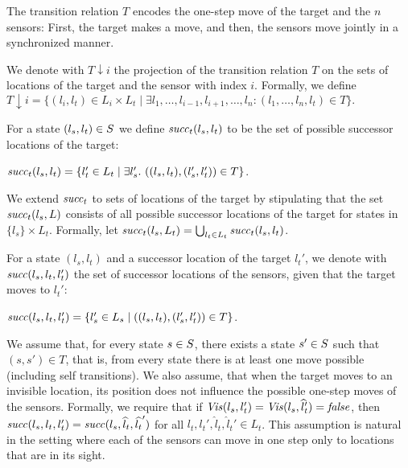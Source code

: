 The transition relation $T$ encodes the one-step move of the target and the $n$ sensors: First, the target makes a move, and then, the sensors move jointly in a synchronized manner. 

We denote with $T{\downarrow}i$ the projection of the transition relation $T$ on the sets of locations of the target and the sensor with index $i$. Formally, we define
$T{\downarrow }i = \{(l_i,l_t) \in L_i \times L_t \mid \exists l_1,\ldots,l_{i-1},l_{i+1},\ldots,l_n : (l_1,\ldots,l_n,l_t) \in T\}.$ 

For a state $(l_s,l_t) \in S$ we define $\mathit{succ}_t(l_s,l_t)$ to be the set of possible successor locations of the target:

$\mathit{succ}_t(l_s,l_{t}) = \{l_{t}' \in L_t \mid \exists l_s'.\ ((l_s,l_t),(l_s',l_t')) \in T\}$.

We extend $\mathit{succ}_t$ to sets of locations of the target by stipulating that the set $\mathit{succ}_t(l_s,L)$ consists of all possible successor locations of the target for states in $\{l_s\} \times L_t$. Formally, let $\mathit{succ}_t(l_s, L_t) = \bigcup_{l_t \in L_t}\mathit{succ}_t(l_s,l_t)$.

For a state $(l_s,l_t)$ and a successor location of the target $l_t'$, we denote with $\mathit{succ}(l_s,l_t,l_t')$ the set of successor locations of the sensors, given that the target moves to $l_t'$: 

$\mathit{succ}(l_s,l_t,l_t') = \{l_s' \in L_s \mid  ((l_s,l_t),(l_s',l_t')) \in T\}$.

We assume that, for every state $s\in S$, there exists a state $s' \in S$ such that $(s,s') \in T$, that is, from every state there is at least one move possible (including self transitions). We also assume, that when the target moves to an invisible location, its position does not influence the possible one-step moves of the sensors. Formally, we require that if $\mathit{Vis}(l_s,l_t') = \mathit{Vis}(l_s,{\widehat l_t}')=\mathit{false}$, then $\mathit{succ}(l_s,l_t,l_t') = \mathit{succ}(l_s,{\widehat l_t},\widehat{l_t}')$ for all $l_t,l_t',\widehat l_t,\widehat l_t' \in L_t$. This assumption is natural in the setting where each of the  sensors can move in one step only to locations that are in its sight.

